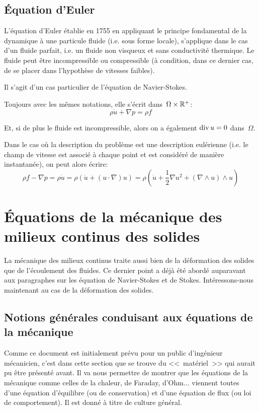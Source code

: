 \medskip
\subsection{Équation d'Euler}


L'équation d'Euler établie en 1755 en appliquant le principe fondamental de la dynamique
à une particule fluide (i.e. sous forme locale), s'applique dans le cas d'un fluide parfait, i.e. 
un fluide non visqueux et sans conductivité thermique. 
Le fluide peut être incompressible ou compressible (à condition, dans ce dernier cas, de 
se placer dans l'hypothèse de vitesses faibles). 

Il s'agit d'un cas particulier de l'équation de Navier-Stokes.

\medskip
Toujours avec les mêmes notations, elle s'écrit dans~$\Omega\times\mathbb R^+$:
\begin{equation}
\rho \dot{u} + \nabla p = \rho f
\end{equation}

Et, si de plus le fluide est incompressible, alors on a également 
$\operatorname{div} u = 0$ dans~$\Omega$.

\medskip{}
Dans le cas où la description du problème est une description eulérienne (i.e. le champ de
vitesse est associé à chaque point et est considéré de manière instantanée), on peut alors écrire:
\begin{equation}
  \rho f - \nabla p = \rho \dot{u} =
	\rho \left(\dot{u} + (u\cdot\nabla)u \right)=
	\rho \left( \dot{u} + \frac12 \nabla u^2 + (\nabla\wedge u)\wedge u \right)
\end{equation}

\medskip
{}

\medskip
\section{Équations de la mécanique des milieux continus des solides}
La mécanique des milieux continus traite aussi bien de la déformation des solides que de l'écoulement des fluides.
Ce dernier point a déjà été abordé auparavant aux paragraphes sur les équation de Navier-Stokes et de Stokes.
Intéressons-nous maintenant au cas de la déformation des solides.

\medskip{}
\subsection{Notions générales conduisant aux équations de la mécanique}
Comme ce document est initialement prévu pour un public d'ingénieur mécanicien,
c'est dans cette section que se trouve du <<~matériel~>> qui aurait pu être présenté avant. Il va nous permettre de montrer que les équations de la mécanique comme celles de la chaleur, de Faraday, d'Ohm... viennent toutes d'une équation d'équilibre (ou de conservation) et d'une équation de flux (ou loi de comportement). Il est donné à titre de culture général.

